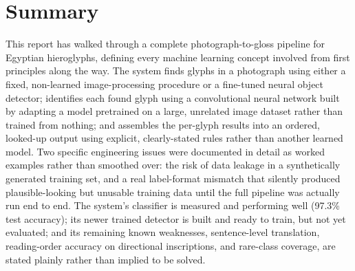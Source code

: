 \documentclass[11pt,a4paper]{report}
\begin{document}
\chapter{Summary}

This report has walked through a complete photograph-to-gloss pipeline for
Egyptian hieroglyphs, defining every machine learning concept involved from
first principles along the way. The system finds glyphs in a photograph
using either a fixed, non-learned image-processing procedure or a fine-tuned
neural object detector; identifies each found glyph using a convolutional
neural network built by adapting a model pretrained on a large, unrelated
image dataset rather than trained from nothing; and assembles the
per-glyph results into an ordered, looked-up output using explicit,
clearly-stated rules rather than another learned model. Two specific
engineering issues were documented in detail as worked examples rather than
smoothed over: the risk of data leakage in a synthetically generated
training set, and a real label-format mismatch that silently produced
plausible-looking but unusable training data until the full pipeline was
actually run end to end. The system's classifier is measured and performing
well (97.3\% test accuracy); its newer trained detector is built and ready
to train, but not yet evaluated; and its remaining known weaknesses,
sentence-level translation, reading-order accuracy on directional
inscriptions, and rare-class coverage, are stated plainly rather than
implied to be solved.
\end{document}
